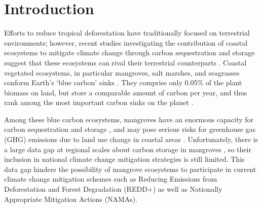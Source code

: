 \documentclass[review, authoryear]{elsarticle}   	%
\begin{document}
%

\linenumbers

\section{Introduction}

Efforts to reduce tropical deforestation have traditionally focused on terrestrial environments; however, recent studies investigating the contribution of coastal ecosystems to mitigate climate change through carbon sequestration and storage suggest that these ecosystems can rival their terrestrial counterparts \citep{Yee2010}. Coastal vegetated ecosystems, in particular mangroves, salt marshes, and seagrasses conform Earth's `blue carbon' sinks \citep{Herr2012}. They comprise only  0.05\% of the plant biomass on land, but store a comparable amount of carbon per year, and thus rank among the most important carbon sinks on the planet \citep{Nellemann2009}. 


Among these blue carbon ecosystems, mangroves have an enormous capacity for carbon sequestration and storage \citep{Nellemann2009, Donato2011, Adame2013}, and may pose serious risks for greenhouse gas (GHG) emissions due to land use change in coastal areas \citep{WorldBank2010}. Unfortunately, there is a large data gap at regional scales about carbon storage in mangroves \citep{Donato2011}, so their inclusion in national climate change mitigation strategies is still limited. This data gap hinders the possibility of mangrove ecosystems to participate in current climate change mitigation schemes such as Reducing Emissions from Deforestation and Forest Degradation (REDD+) as well as Nationally Appropriate Mitigation Actions (NAMAs)\citep{Alongi2011, Herr2012, Murray2012, Boucher2014}. %
\end{document}
